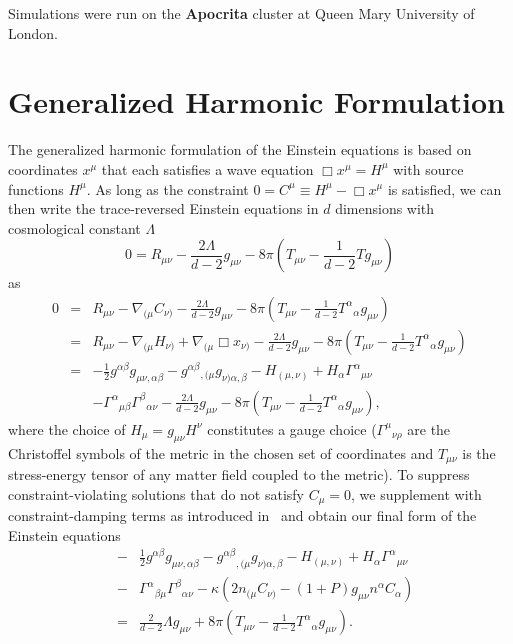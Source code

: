 \documentclass[12pt]{iopart} %
\begin{document}
\ack
Simulations were run on the {\bf Apocrita} cluster at Queen Mary University of London.

\appendix
\section{Generalized Harmonic Formulation}
\label{sec:GHfor}

The generalized harmonic formulation of the Einstein equations is based on coordinates $x^\mu$ that each satisfies a wave equation $\Box x^{\mu}=H^\mu$ with source functions $H^\mu$.
As long as the constraint $0=C^\mu \equiv H^\mu-\Box x^\mu$ is satisfied, we can then write the trace-reversed Einstein equations in $d$ dimensions with cosmological constant $\Lambda$
\begin{equation}
0=R_{\mu\nu} - \frac{2\Lambda}{d-2} g_{\mu\nu} - 8\pi\left( T_{\mu\nu} - \frac{1}{d-2} T g_{\mu\nu} \right)
\end{equation}
as
\begin{eqnarray}
0
&=& R_{\mu\nu} - \nabla_{(\mu} C_{\nu)} - \frac{2\Lambda}{d-2} g_{\mu\nu} - 8\pi\left( T_{\mu\nu} - \frac{1}{d-2} {T^\alpha}_\alpha g_{\mu\nu} \right) \nonumber \\
&=& R_{\mu\nu} - \nabla_{(\mu} H_{\nu)} + \nabla_{(\mu} \Box{x}_{\nu)} - \frac{2\Lambda}{d-2} g_{\mu\nu} - 8\pi\left( T_{\mu\nu} - \frac{1}{d-2} {T^\alpha}_\alpha g_{\mu\nu} \right) \nonumber \\
&=& -\frac{1}{2} g^{\alpha\beta} g_{\mu\nu,\alpha\beta} - g^{\alpha\beta}{}_{,(\mu}g_{\nu)\alpha,\beta} - H_{(\mu,\nu)} + H_\alpha \Gamma^\alpha{}_{\mu\nu} \nonumber \\
&&- \Gamma^\alpha{}_{\mu\beta}\Gamma^\beta{}_{\alpha\nu} - \frac{2\Lambda}{d-2} g_{\mu\nu} - 8\pi\left( T_{\mu\nu} - \frac{1}{d-2} {T^\alpha}_\alpha g_{\mu\nu} \right) \nonumber,
\end{eqnarray}
where the choice of $H_\mu = g_{\mu\nu} H^\nu$ constitutes a gauge choice ($\Gamma^\mu{}_{\nu\rho}$ are the Christoffel symbols of the metric in the chosen set of coordinates and $T_{\mu\nu}$ is the stress-energy tensor of any matter field coupled to the metric). 
To suppress constraint-violating solutions that do not satisfy $C_\mu=0$, we supplement with constraint-damping terms as introduced in~\cite{Gundlach:2005eh} and obtain our final form of the Einstein equations
\begin{eqnarray}\label{eqn:efe_gh_modified}
&-& \frac{1}{2} g^{\alpha \beta} g_{\mu \nu, \alpha \beta} - 
{g^{\alpha \beta}}_{,(\mu} g_{\nu) \alpha, \beta} - H_{(\mu, \nu)} + H_\alpha {\Gamma^\alpha}_{\mu \nu} \nonumber \\
&-& {\Gamma^\alpha}_{\beta \mu} {\Gamma^\beta}_{\alpha \nu} - \kappa \left( 2 n_{(\mu} C_{\nu)} - (1+P) g_{\mu \nu} n^\alpha 
C_\alpha \right) \nonumber \\
&=&   \frac{2}{d-2} \Lambda g_{\mu \nu} + 8\pi \left( T_{\mu \nu} - 
\frac{1}{d-2} {T^\alpha}_\alpha g_{\mu \nu} \right).
\end{eqnarray}
\end{document}
